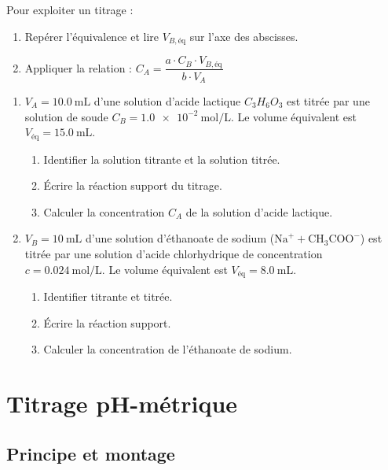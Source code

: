  Pour exploiter un titrage :
\begin{enumerate}
    \item Repérer l'équivalence et lire $V_{B,\text{éq}}$ sur l'axe des abscisses.
    \item Appliquer la relation : $C_A = \dfrac{a \cdot C_B \cdot V_{B,\text{éq}}}{b \cdot V_A}$
\end{enumerate}


\begin{enumerate}
    \item $V_A = \SI{10.0}{\milli\liter}$ d'une solution d'acide lactique $C_3H_6O_3$ est titrée par une solution de soude $C_B = \SI{1.0e-2}{\mol\per\liter}$. Le volume équivalent est $V_{\text{éq}} = \SI{15.0}{\milli\liter}$.
    \begin{enumerate}
        \item Identifier la solution titrante et la solution titrée.
        \item Écrire la réaction support du titrage.
        \item Calculer la concentration $C_A$ de la solution d'acide lactique.
    \end{enumerate}
    \item $V_B = \SI{10}{\milli\liter}$ d'une solution d'éthanoate de sodium ($\text{Na}^+ + \text{CH}_3\text{COO}^-$) est titrée par une solution d'acide chlorhydrique de concentration $c = \SI{0.024}{\mol\per\liter}$. Le volume équivalent est $V_{\text{éq}} = \SI{8.0}{\milli\liter}$.
    \begin{enumerate}
        \item Identifier titrante et titrée.
        \item Écrire la réaction support.
        \item Calculer la concentration de l'éthanoate de sodium.
    \end{enumerate}
\end{enumerate}

\vspace{5cm}

\section{Titrage pH-métrique}

\subsection{Principe et montage}

